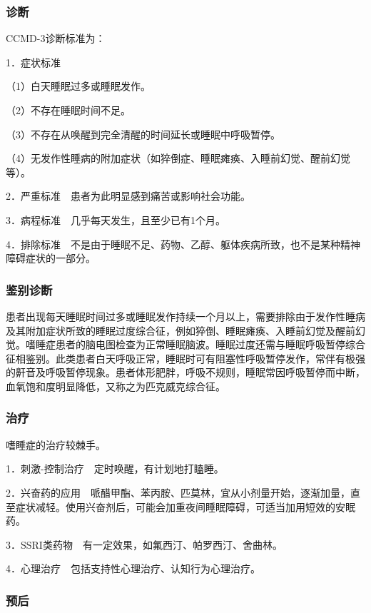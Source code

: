\subsubsection{诊断}

CCMD-3诊断标准为：

1．症状标准

（1）白天睡眠过多或睡眠发作。

（2）不存在睡眠时间不足。

（3）不存在从唤醒到完全清醒的时间延长或睡眠中呼吸暂停。

（4）无发作性睡病的附加症状（如猝倒症、睡眠瘫痪、入睡前幻觉、醒前幻觉等）。

2．严重标准　患者为此明显感到痛苦或影响社会功能。

3．病程标准　几乎每天发生，且至少已有1个月。

4．排除标准　不是由于睡眠不足、药物、乙醇、躯体疾病所致，也不是某种精神障碍症状的一部分。

\subsubsection{鉴别诊断}

患者出现每天睡眠时间过多或睡眠发作持续一个月以上，需要排除由于发作性睡病及其附加症状所致的睡眠过度综合征，例如猝倒、睡眠瘫痪、入睡前幻觉及醒前幻觉。嗜睡症患者的脑电图检查为正常睡眠脑波。睡眠过度还需与睡眠呼吸暂停综合征相鉴别。此类患者白天呼吸正常，睡眠时可有阻塞性呼吸暂停发作，常伴有极强的鼾音及呼吸暂停现象。患者体形肥胖，呼吸不规则，睡眠常因呼吸暂停而中断，血氧饱和度明显降低，又称之为匹克威克综合征。

\subsubsection{治疗}

嗜睡症的治疗较棘手。

1．刺激-控制治疗　定时唤醒，有计划地打瞌睡。

2．兴奋药的应用　哌醋甲酯、苯丙胺、匹莫林，宜从小剂量开始，逐渐加量，直至症状减轻。使用兴奋剂后，可能会加重夜间睡眠障碍，可适当加用短效的安眠药。

3．SSRI类药物　有一定效果，如氟西汀、帕罗西汀、舍曲林。

4．心理治疗　包括支持性心理治疗、认知行为心理治疗。

\subsubsection{预后}

